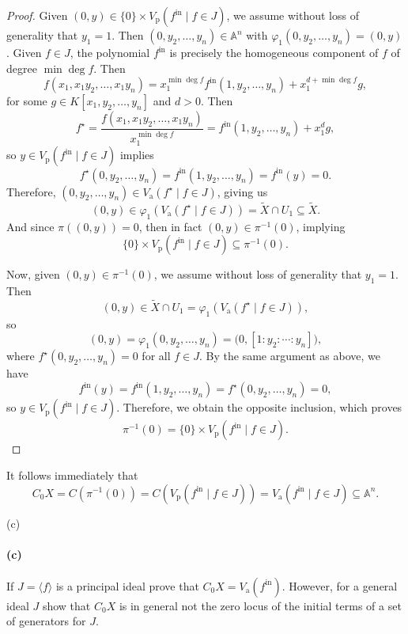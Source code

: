 \documentclass[12pt]{article}
\newenvironment{fullbox}{\begin{lrbox}{\savefullbox}\begin{minipage}{\dimexpr\textwidth-2\fboxsep\relax}}{\end{minipage}\end{lrbox}\begin{center}\framebox[\textwidth]{\usebox{\savefullbox}}\end{center}}
\newenvironment{pbox}[1][]{\begin{fullbox}\ifx#1\empty\else\paragraph{#1}\fi}{\end{fullbox}}
\theoremstyle{definition}
\renewcommand{\phi}{\varphi}
\newcommand{\<}{\langle}
\renewcommand{\>}{\rangle}
\newcommand{\Vp}{V_{\mathrm{p}}}
\newcommand{\Va}{V_{\mathrm{a}}}
\newcommand{\A}{\mathbb{A}}
\newcommand{\blow}{\widetilde}
\newcommand{\init}{\mathrm{in}}
\begin{document}
\begin{proof}
    Given $(0, y) \in \{0\} \times \Vp(f^\init \mid f \in J)$, we assume without loss of generality that $y_1 = 1$. Then $(0, y_2, \dots, y_n) \in \A^n$ with $\phi_1(0, y_2, \dots, y_n) = (0, y)$. Given $f \in J$, the polynomial $f^\init$ is precisely the homogeneous component of $f$ of degree $\min\deg f$. Then
    \[
        f(x_1, x_1y_2, \dots, x_1y_n) = x_1^{\min\deg f}f^\init(1, y_2, \dots, y_n) + x_1^{d + \min\deg f}g,
    \]
    for some $g \in K[x_1, y_2, \dots, y_n]$ and $d > 0$. Then
    \[
        f^\star 
            = \frac{f(x_1, x_1y_2, \dots, x_1y_n)}{x_1^{\min\deg f}}
            = f^\init(1, y_2, \dots, y_n) + x_1^dg,
    \]
    so $y \in \Vp(f^\init \mid f \in J)$ implies
    \[
        f^\star(0, y_2, \dots, y_n) = f^\init(1, y_2, \dots, y_n) = f^\init(y) = 0.
    \]
    Therefore, $(0, y_2, \dots, y_n) \in \Va(f^\star \mid f \in J)$, giving us
    \[
        (0, y) \in \phi_1(\Va(f^\star \mid f \in J)) = \blow{X} \cap U_1 \subseteq \blow{X}.
    \]
    And since $\pi((0, y)) = 0$, then in fact $(0, y) \in \pi^{-1}(0)$, implying
    \[
        \{0\} \times \Vp(f^\init \mid f \in J) \subseteq \pi^{-1}(0).
    \]

    Now, given $(0, y) \in \pi^{-1}(0)$, we assume without loss of generality that $y_1 = 1$. Then \[
        (0, y) \in \blow{X} \cap U_1 = \phi_1(\Va(f^\star \mid f \in J)),
    \]
    so
    \[
        (0, y) = \phi_1(0, y_2, \dots, y_n) = \big(0, [1 : y_2 : \cdots : y_n]\big),
    \]
    where $f^\star(0, y_2, \dots, y_n) = 0$ for all $f \in J$. By the same argument as above, we have
    \[
        f^\init(y) = f^\init(1, y_2, \dots, y_n) = f^\star(0, y_2, \dots, y_n) = 0,
    \]
    so $y \in \Vp(f^\init \mid f \in J)$. Therefore, we obtain the opposite inclusion, which proves
    \[
        \pi^{-1}(0) = \{0\} \times \Vp(f^\init \mid f \in J).
    \]
    
\end{proof}

It follows immediately that
\[
    C_0X = C(\pi^{-1}(0)) = C(\Vp(f^\init \mid f \in J)) = \Va(f^\init \mid f \in J) \subseteq \A^n.
\]



\newpage
\begin{pbox}[(c)]
    If $J = \<f\>$ is a principal ideal prove that $C_0X = \Va(f^\init)$. However, for a general ideal $J$ show that $C_0X$ is in general not the zero locus of the initial terms of a set of generators for $J$.
\end{pbox}
\end{document}
